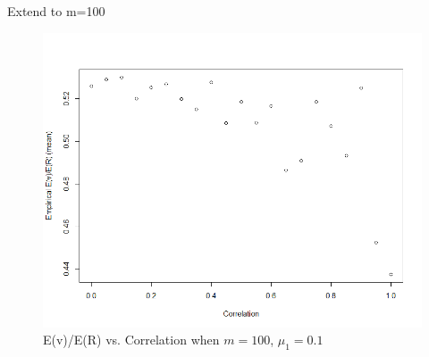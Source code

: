 \documentclass{beamer}
\begin{document}
\begin{frame}[t]{Extend to m=100}\vspace{10pt}

\begin{figure}[h]
	\centering
	\includegraphics[scale=0.35]{EvEr_m=100_2}
	\caption{\footnotesize{E(v)/E(R) vs. Correlation when $m=100$, $\mu_1=0.1$}}
	\label{fig7}
\end{figure}

\end{frame}
\end{document}
